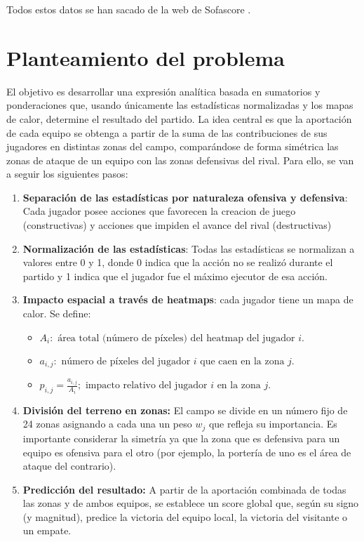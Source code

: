 Todos estos datos se han sacado de la web de Sofascore \cite{Sofascore}.

\section{Planteamiento del problema}
El objetivo es desarrollar una expresión analítica basada en sumatorios y ponderaciones que, usando únicamente las estadísticas normalizadas y los mapas de calor, determine el resultado del partido. La idea central es que la aportación de cada equipo se obtenga a partir de la suma de las contribuciones de sus jugadores en distintas zonas del campo, comparándose de forma simétrica las zonas de ataque de un equipo con las zonas defensivas del rival. Para ello, se van a seguir los siguientes pasos:

\begin{enumerate}
    \item \textbf{Separación de las estadísticas por naturaleza ofensiva y defensiva}: Cada jugador posee acciones que favorecen la creacion de juego (constructivas) y acciones que impiden el avance del rival (destructivas)
    \item \textbf{Normalización de las estadísticas}: Todas las estadísticas se normalizan a valores entre 0 y 1, donde 0 indica que la acción no se realizó durante el partido y 1 indica que el jugador fue el máximo ejecutor de esa acción.
    \item \textbf{Impacto espacial a través de heatmaps}: cada jugador tiene un mapa de calor. Se define:
    \begin{itemize}
        \item $ A_i: \text{ área total (número de píxeles) del heatmap del jugador } i.$
        \item $ a_{i,j}: \text{ número de píxeles del jugador } i \text{ que caen en la zona } j. $
        \item $ p_{i,j} = \frac{a_{i,j}}{A_i}; \text{ impacto relativo del jugador } i \text{ en la zona } j. $
    \end{itemize} 

    \item \textbf{División del terreno en zonas:} El campo se divide en un número fijo de 24 zonas asignando a cada una un peso $w_j$ que refleja su importancia. Es importante 
    considerar la simetría ya que la zona que es defensiva para un equipo es ofensiva para el otro (por ejemplo, la portería de uno es el área de ataque del contrario).
    \item \textbf{Predicción del resultado:} A partir de la aportación combinada de todas las zonas y de ambos equipos, se establece un score global que, según su signo (y magnitud),
    predice la victoria del equipo local, la victoria del visitante o un empate.

\end{enumerate}

